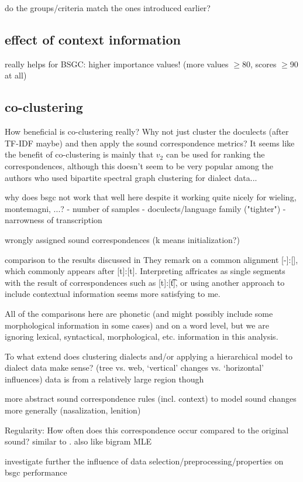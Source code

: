 \documentclass[a4paper]{article}
\begin{document}
do the groups/criteria match the ones introduced earlier?

\subsection{effect of context information}

really helps for BSGC: higher importance values! (more values $\geq$80, scores $\geq$90 at all)

\subsection{co-clustering}
How beneficial is co-clustering really? Why not just cluster the doculects (after TF-IDF maybe) and then apply the sound correspondence metrics? It seems like the benefit of co-clustering is mainly that $v_2$ can be used for ranking the correspondences, although this doesn't seem to be very popular among the authors who used bipartite spectral graph clustering for dialect data...

why does bsgc not work that well here despite it working quite nicely for wieling, montemagni, ...?
- number of samples
- doculects/language family ("tighter")
- narrowness of transcription

wrongly assigned sound correspondences (k means initialization?)

comparison to the results discussed in \citet{wieling2011bipartite}
They remark on a common alignment [-]:[\textesh], which commonly appears after [t]:[t]. Interpreting affricates as single segments with the result of correspondences such as [t]:[\t{t\textesh}], or using another approach to include contextual information seems more satisfying to me.


All of the comparisons here are phonetic (and might possibly include some morphological information in some cases) and on a word level, but we are ignoring lexical, syntactical, morphological, etc. information in this analysis.

To what extend does clustering dialects and/or applying a hierarchical model to dialect data make sense? (tree vs. web, `vertical' changes vs. `horizontal' influences)
data is from a relatively large region though

more abstract sound correspondence rules (incl. context) to model sound changes more generally (nasalization, lenition)

Regularity: How often does this correspondence occur compared to the original sound? similar to \citet{prokic2013combining}. also like bigram MLE

investigate further the influence of data selection/preprocessing/properties on bsgc performance

\newpage


\end{document}
